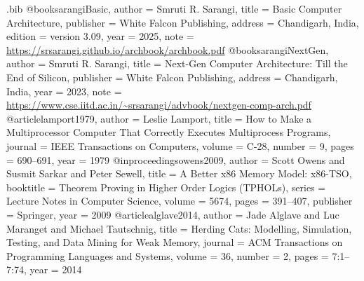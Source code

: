 %
\begin{filecontents*}{\jobname.bib}
@book{sarangiBasic,
  author    = {Smruti R. Sarangi},
  title     = {Basic Computer Architecture},
  publisher = {White Falcon Publishing},
  address   = {Chandigarh, India},
  edition   = {version 3.09},
  year      = {2025},
  note      = {\url{https://srsarangi.github.io/archbook/archbook.pdf}}
}
@book{sarangiNextGen,
  author    = {Smruti R. Sarangi},
  title     = {Next-Gen Computer Architecture: Till the End of Silicon},
  publisher = {White Falcon Publishing},
  address   = {Chandigarh, India},
  year      = {2023},
  note      = {\url{https://www.cse.iitd.ac.in/~srsarangi/advbook/nextgen-comp-arch.pdf}}
}
@article{lamport1979,
  author  = {Leslie Lamport},
  title   = {How to Make a Multiprocessor Computer That Correctly Executes Multiprocess Programs},
  journal = {IEEE Transactions on Computers},
  volume  = {C-28},
  number  = {9},
  pages   = {690--691},
  year    = {1979}
}
@inproceedings{owens2009,
  author    = {Scott Owens and Susmit Sarkar and Peter Sewell},
  title     = {A Better x86 Memory Model: x86-{TSO}},
  booktitle = {Theorem Proving in Higher Order Logics (TPHOLs)},
  series    = {Lecture Notes in Computer Science},
  volume    = {5674},
  pages     = {391--407},
  publisher = {Springer},
  year      = {2009}
}
@article{alglave2014,
  author  = {Jade Alglave and Luc Maranget and Michael Tautschnig},
  title   = {Herding Cats: Modelling, Simulation, Testing, and Data Mining for Weak Memory},
  journal = {ACM Transactions on Programming Languages and Systems},
  volume  = {36},
  number  = {2},
  pages   = {7:1--7:74},
  year    = {2014}
}
\end{filecontents*}

\documentclass[12pt,a4paper,twoside,openany]{report}

